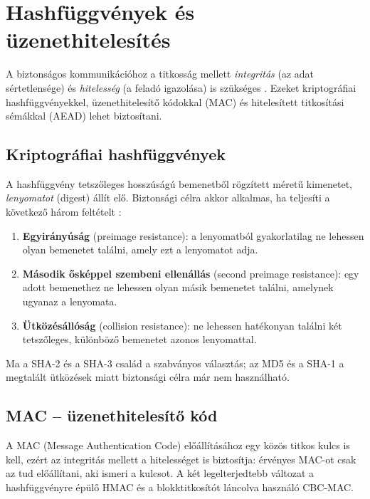 \documentclass[a4paper,12pt]{report}
\theoremstyle{definition}
\theoremstyle{remark}
\begin{document}
\section{Hashfüggvények és üzenethitelesítés}\label{sec:hash}

A biztonságos kommunikációhoz a titkosság mellett \emph{integritás} (az adat sértetlensége) és \emph{hitelesség} (a feladó igazolása) is szükséges \cite{Stallings2017}. Ezeket kriptográfiai hashfüggvényekkel, üzenethitelesítő kódokkal (MAC) és hitelesített titkosítási sémákkal (AEAD) lehet biztosítani.

\subsection{Kriptográfiai hashfüggvények}

A hashfüggvény tetszőleges hosszúságú bemenetből rögzített méretű kimenetet, \emph{lenyomatot} (digest) állít elő. Biztonsági célra akkor alkalmas, ha teljesíti a következő három feltételt \cite{Paar2010}:
\begin{enumerate}
	\item \textbf{Egyirányúság} (preimage resistance): a lenyomatból gyakorlatilag ne lehessen olyan bemenetet találni, amely ezt a lenyomatot adja.
	\item \textbf{Második ősképpel szembeni ellenállás} (second preimage resistance): egy adott bemenethez ne lehessen olyan másik bemenetet találni, amelynek ugyanaz a lenyomata.
	\item \textbf{Ütközésállóság} (collision resistance): ne lehessen hatékonyan találni két tetszőleges, különböző bemenetet azonos lenyomattal.
\end{enumerate}
Ma a SHA-2 és a SHA-3 család a szabványos választás; az MD5 és a SHA-1 a megtalált ütközések miatt biztonsági célra már nem használható.

\subsection{MAC -- üzenethitelesítő kód}

A MAC (Message Authentication Code) előállításához egy közös titkos kulcs is kell, ezért az integritás mellett a hitelességet is biztosítja: érvényes MAC-ot csak az tud előállítani, aki ismeri a kulcsot. A két legelterjedtebb változat a hashfüggvényre épülő HMAC \cite{Stallings2017} és a blokktitkosítót láncolva használó CBC-MAC.
\end{document}
